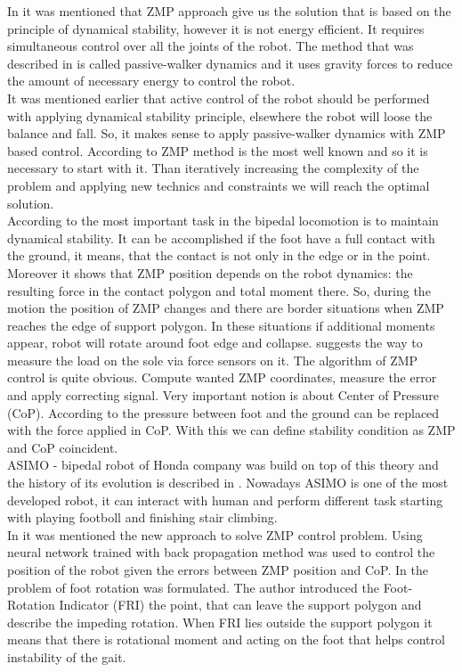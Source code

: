 \documentclass[11pt,a4paper]{article}
\begin{document}
In \cite{manchester2011stable} it was mentioned that ZMP approach give us the solution that is based on the principle of dynamical stability, however it is not energy efficient. It requires simultaneous control over all the joints of the robot. The method that was described in \cite{collins2001three} is called passive-walker dynamics and it uses gravity forces to reduce the amount of necessary energy to control the robot.\\
It was mentioned earlier that active control of the robot should be performed with applying dynamical stability principle, elsewhere the robot will loose the balance and fall. So, it makes sense to apply passive-walker dynamics with ZMP based control. According to \cite{vukobratovic2004zero} ZMP method is the most well known and so it is necessary to start with it. Than iteratively increasing the complexity of the problem and applying new technics and constraints we will reach the optimal solution.\\
According to \cite{vukobratovic2004zero} the most important task in the bipedal locomotion is to maintain dynamical stability. It can be accomplished if the foot have a full contact with the ground, it means, that the contact is not only in the edge or in the point. Moreover it shows that ZMP position depends on the robot dynamics: the resulting force in the contact polygon and total moment there. So, during the motion the position of ZMP changes and there are border situations when ZMP reaches the edge of support polygon. In these situations if additional moments appear, robot will rotate around foot edge and collapse. \cite{vukobratovic2004zero} suggests the way to measure the load on the sole via force sensors on it. The algorithm of ZMP control is quite obvious. Compute wanted ZMP coordinates, measure the error and apply correcting signal. Very important notion is about Center of Pressure (CoP). According to \cite{vukobratovic2004zero} the pressure between foot and the ground can be replaced with the force applied in CoP. With this we can define stability condition as ZMP and CoP coincident.\\
ASIMO - bipedal robot of Honda company was build on top of this theory and the history of its evolution is described in \cite{hirai1998development}. Nowadays ASIMO is one of the most developed robot, it can interact with human and perform different task starting with playing footboll and finishing stair climbing.\\ 
In \cite{kim2012zmp} it was mentioned the new approach to solve ZMP control problem. Using neural network trained with back propagation method was used to control the position of the robot given the errors between ZMP position and CoP.
In \cite{goswami1999postural} the problem of foot rotation was formulated. The author introduced the Foot-Rotation Indicator (FRI) the point, that can leave the support polygon and describe the impeding rotation. When FRI lies outside the support polygon it means that there is rotational moment and acting on the foot that helps control instability of the gait.
\end{document}
